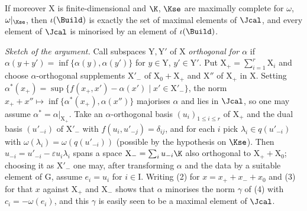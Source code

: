 \documentclass[12pt,a4paper,oneside,english]{smfart}
\theoremstyle{definition}
\theoremstyle{bt}
\begin{document}
If moreover $\mathrm{X}$ is finite-dimensional and $\K$, $\Kse$ are maximally
complete for $\omega$, $\omega|_{\Kse}$, then $\iota(\Build)$ is exactly the set
of maximal elements of $\Jcal$, and every element of $\Jcal$ is minorised by an
element of $\iota(\Build)$.

\emph{Sketch of the argument.} Call subspaces $\mathrm{Y},\mathrm{Y}'$ of
$\mathrm{X}$ \emph{orthogonal for $\alpha$} if
$\alpha(y+y')=\inf\{\alpha(y),\alpha(y')\}$ for $y\in\mathrm{Y}$,
$y'\in\mathrm{Y}'$. Put $\mathrm{X}_{+}=\sum_{i=1}^{r}\mathrm{X}_i$ and choose
$\alpha$-orthogonal supplements $\mathrm{X}'_{-}$ of
$\mathrm{X}_0+\mathrm{X}_{+}$ and $\mathrm{X}''$ of $\mathrm{X}_{+}$ in
$\mathrm{X}$. Setting
$\alpha^{*}(x_{+})=\sup\{f(x_{+},x')-\alpha(x')\mid x'\in\mathrm{X}'_{-}\}$,
the norm $x_{+}+x''\mapsto\inf\{\alpha^{*}(x_{+}),\alpha(x'')\}$ majorises
$\alpha$ and lies in $\Jcal$, so one may assume
$\alpha^{*}=\alpha|_{\mathrm{X}_{+}}$. Take an $\alpha$-orthogonal basis
$(u_i)_{1\leqslant i\leqslant r}$ of $\mathrm{X}_{+}$ and the dual basis
$(u'_{-i})$ of $\mathrm{X}'_{-}$ with $f(u_i,u'_{-j})=\delta_{ij}$, and for each
$i$ pick $\lambda_i\in q(u'_{-i})$ with $\omega(\lambda_i)=\omega(q(u'_{-i}))$
(possible by the hypothesis on $\Kse$). Then
$u_{-i}=u'_{-i}-\varepsilon u_i\lambda_i$ spans a space
$\mathrm{X}_{-}=\sum_i u_{-i}\K$ also orthogonal to $\mathrm{X}_{+}+\mathrm{X}_0$;
choosing it as $\mathrm{X}'_{-}$ one may, after transforming $\alpha$ and the
data by a suitable element of $\mathrm{G}$, assume $e_i=u_i$ for
$i\in\mathrm{I}$. Writing (2) for $x=x_{+}+x_{-}+x_0$ and (3) for that $x$
against $\mathrm{X}_{+}$ and $\mathrm{X}_{-}$ shows that $\alpha$ minorises the
norm $\gamma$ of (4) with $c_i=-\omega(e_i)$, and this $\gamma$ is easily seen
to be a maximal element of $\Jcal$.
\end{document}
